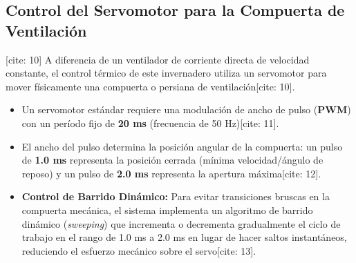 \subsection{Control del Servomotor para la Compuerta de Ventilación} [cite: 10]
A diferencia de un ventilador de corriente directa de velocidad constante, el control térmico de este invernadero utiliza un servomotor para mover físicamente una compuerta o persiana de ventilación[cite: 10].
\begin{itemize}
	\item Un servomotor estándar requiere una modulación de ancho de pulso (\textbf{PWM}) con un período fijo de \textbf{20 ms} (frecuencia de 50 Hz)[cite: 11].
	\item El ancho del pulso determina la posición angular de la compuerta: un pulso de \textbf{1.0 ms} representa la posición cerrada (mínima velocidad/ángulo de reposo) y un pulso de \textbf{2.0 ms} representa la apertura máxima[cite: 12].
	\item \textbf{Control de Barrido Dinámico:} Para evitar transiciones bruscas en la compuerta mecánica, el sistema implementa un algoritmo de barrido dinámico (\textit{sweeping}) que incrementa o decrementa gradualmente el ciclo de trabajo en el rango de 1.0 ms a 2.0 ms en lugar de hacer saltos instantáneos, reduciendo el esfuerzo mecánico sobre el servo[cite: 13].
\end{itemize}